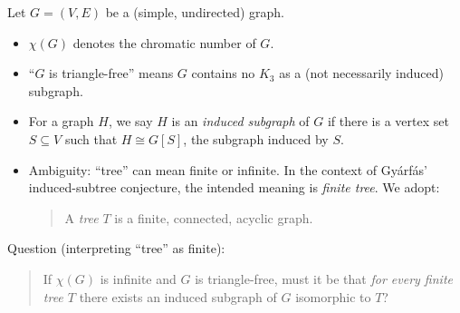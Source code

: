Let $G=(V,E)$ be a (simple, undirected) graph.

\begin{itemize}[leftmargin=*]
\item $\chi(G)$ denotes the chromatic number of $G$.
\item ``$G$ is triangle-free'' means $G$ contains no $K_3$ as a (not necessarily induced) subgraph.
\item For a graph $H$, we say $H$ is an \emph{induced subgraph} of $G$ if there is a vertex set $S\subseteq V$ such that $H\cong G[S]$, the subgraph induced by $S$.
\item Ambiguity: ``tree'' can mean finite or infinite. In the context of Gy\'{a}rf\'{a}s' induced-subtree conjecture, the intended meaning is \emph{finite tree}. We adopt:
\begin{quote}
A \emph{tree} $T$ is a finite, connected, acyclic graph.
\end{quote}
\end{itemize}

Question (interpreting ``tree'' as finite):
\begin{quote}
If $\chi(G)$ is infinite and $G$ is triangle-free, must it be that \emph{for every finite tree $T$} there exists an induced subgraph of $G$ isomorphic to $T$?
\end{quote}
